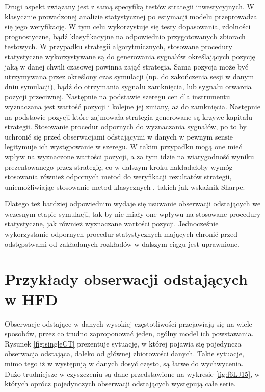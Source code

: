 \documentclass[a4paper,12pt,openany, DIV=calc, headsepline]{scrbook}
\begin{document}
Drugi aspekt związany jest z samą specyfiką testów strategii inwestycyjnych. W klasycznie prowadzonej analizie statystycznej po estymacji modelu przeprowadza się jego weryfikację. W tym celu wykorzystuje się testy dopasowania, zdolności prognostyczne, bądź klasyfikacyjne na odpowiednio przygotowanych zbiorach testowych. W przypadku strategii algorytmicznych, stosowane procedury statystyczne wykorzystywane są do generowania sygnałów określających pozycję jaką w danej chwili czasowej powinna zająć strategia. Sama pozycja może być utrzymywana przez określony czas symulacji (np. do zakończenia sesji w danym dniu symulacji), bądź do otrzymania sygnału zamknięcia, lub sygnału otwarcia pozycji przeciwnej. Następnie na podstawie szeregu cen dla instrumentu wyznaczana jest wartość pozycji i kolejne jej zmiany, aż do zamknięcia. Następnie na podstawie pozycji które zajmowała strategia generowane są krzywe kapitału strategii. Stosowanie procedur odpornych do wyznaczania sygnałów, po to by uchronić się przed obserwacjami odstającymi w danych w pewnym sensie legitymuje ich występowanie w szeregu. W takim przypadku mogą one mieć wpływ na wyznaczone wartości pozycji, a za tym idzie na wiarygodność wyniku prezentowanego przez strategię, co w dalszym kroku nakładałoby wymóg stosowania również odpornych metod do weryfikacji rezultatów strategii, uniemożliwiając stosowanie metod klasycznych , takich jak wskaźnik Sharpe.  

Dlatego też bardziej odpowiednim wydaje się usuwanie obserwacji odstających we wczesnym etapie symulacji, tak by nie miały one wpływu na stosowane procedury statystyczne, jak również wyznaczane wartości pozycji. Jednocześnie wykorzystanie odpornych procedur statystycznych mających chronić przed odstępstwami od zakładanych rozkładów w dalszym ciągu jest uprawnione.

\section{Przykłady obserwacji odstających w HFD}

Obserwacje odstające w danych wysokiej częstotliwości przejawiają się na wiele sposobów, przez co trudno zaproponować jeden, ogólny model ich powstawania. Rysunek \ref{fig:singleCT} prezentuje sytuację, w której pojawia się pojedyncza obserwacja odstająca, daleko od głównej zbiorowości danych. Takie sytuacje, mimo tego iż w występują w danych dosyć często, są łatwe do wychwycenia. Dużo trudniejsze w czyszczeniu są dane przedstawione na wykresie \ref{fig:f6LJ15}, w których oprócz pojedynczych obserwacji odstających występują całe serie.
\end{document}
